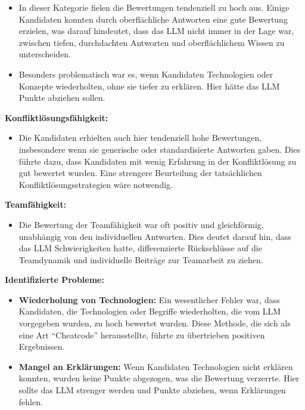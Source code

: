 \begin{itemize}
    \item In dieser Kategorie fielen die Bewertungen tendenziell zu hoch aus. Einige Kandidaten konnten durch oberflächliche Antworten eine gute Bewertung erzielen, was darauf hindeutet, dass das \acs{LLM} nicht immer in der Lage war, zwischen tiefen, durchdachten Antworten und oberflächlichem Wissen zu unterscheiden.
    \item Besonders problematisch war es, wenn Kandidaten Technologien oder Konzepte wiederholten, ohne sie tiefer zu erklären. Hier hätte das \acs{LLM} Punkte abziehen sollen.
\end{itemize}

\textbf{Konfliktlösungsfähigkeit:}

\begin{itemize}
    \item Die Kandidaten erhielten auch hier tendenziell hohe Bewertungen, insbesondere wenn sie generische oder standardisierte Antworten gaben. Dies führte dazu, dass Kandidaten mit wenig Erfahrung in der Konfliktlösung zu gut bewertet wurden. Eine strengere Beurteilung der tatsächlichen Konfliktlösungsstrategien wäre notwendig.
\end{itemize}

\textbf{Teamfähigkeit:}

\begin{itemize}
    \item Die Bewertung der Teamfähigkeit war oft positiv und gleichförmig, unabhängig von den individuellen Antworten. Dies deutet darauf hin, dass das \acs{LLM} Schwierigkeiten hatte, differenzierte Rückschlüsse auf die Teamdynamik und individuelle Beiträge zur Teamarbeit zu ziehen.
\end{itemize}

\textbf{Identifizierte Probleme:}

\begin{itemize}
    \item \textbf{Wiederholung von Technologien:} Ein wesentlicher Fehler war, dass Kandidaten, die Technologien oder Begriffe wiederholten, die vom \acs{LLM} vorgegeben wurden, zu hoch bewertet wurden. Diese Methode, die sich als eine Art ``Cheatcode''  herausstellte, führte zu übertrieben positiven Ergebnissen.
    \item \textbf{Mangel an Erklärungen:} Wenn Kandidaten Technologien nicht erklären konnten, wurden keine Punkte abgezogen, was die Bewertung verzerrte. Hier sollte das \acs{LLM} strenger werden und Punkte abziehen, wenn Erklärungen fehlen.
\end{itemize}

